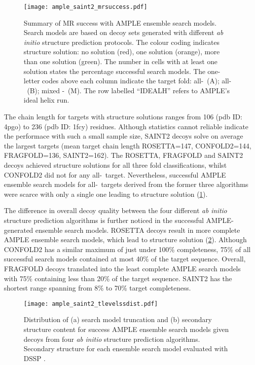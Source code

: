 \begin{figure}[H]
    \centering
    \texttt{[image: ample\_saint2\_mrsuccess.pdf]}
    \caption[Summary of MR success with AMPLE ensemble search models.]{Summary of MR success with AMPLE ensemble search models. Search models are based on decoy sets generated with different \textit{ab initio} structure prediction protocols. The colour coding indicates structure solution: no solution (red), one solution (orange), more than one solution (green). The number in cells with at least one solution states the percentage successful search models. The one-letter codes above each column indicate the target fold: all-\textalpha\ (A); all-\textbeta\ (B); mixed \textalpha-\textbeta\ (M). The row labelled ``IDEALH'' refers to AMPLE's ideal helix run.}
    \label{fig:ample_saint2_mrsuccess}
\end{figure}

The chain length for targets with structure solutions ranges from 106 (\gls{pdb} ID: 4pgo) to 236 (\gls{pdb} ID: 1fcy) residues. Although statistics cannot reliable indicate the performace with such a small sample size, SAINT2 decoys solve on average the largest targets (mean target chain length ROSETTA=147, CONFOLD2=144, FRAGFOLD=136,  SAINT2=162). The ROSETTA, FRAGFOLD and SAINT2 decoys achieved structure solutions for all three fold classifications, whilst CONFOLD2 did not for any all-\textbeta\ target. Nevertheless, successful AMPLE ensemble search models for all-\textbeta\ targets derived from the former three algorithms were scarce with only a single one leading to structure solution (\cref{fig:ample_saint2_mrsuccess}).

The difference in overall decoy quality between the four different \textit{ab initio} structure prediction algorithms is further noticed in the successful AMPLE-generated ensemble search models. ROSETTA decoys result in more complete AMPLE ensemble search models, which lead to structure solution (\cref{fig:ample_saint2_tlevelssdist}). Although CONFOLD2 has a similar maximum of just under 100\% completeness, 75\% of all successful search models contained at most 40\% of the target sequence. Overall, FRAGFOLD decoys translated into the least complete AMPLE search models with 75\% containing less than 20\% of the target sequence. SAINT2 has the shortest range spanning from 8\% to 70\% target completeness.

\begin{figure}[H]
    \centering
    \texttt{[image: ample\_saint2\_tlevelssdist.pdf]}
    \caption[Distribution of search model truncation and secondary structure content]{Distribution of (a) search model truncation and (b) secondary structure content for success AMPLE ensemble search models given decoys from four \textit{ab initio} structure prediction algorithms. Secondary structure for each ensemble search model evaluated with DSSP \cite{Frishman1995-si}.}
    \label{fig:ample_saint2_tlevelssdist}
\end{figure}

